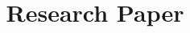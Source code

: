 \documentclass[12pt]{article}
\begin{document}
\title{Research Paper}
%
%
\par
\par
\par
\par
\par
\end{document}
